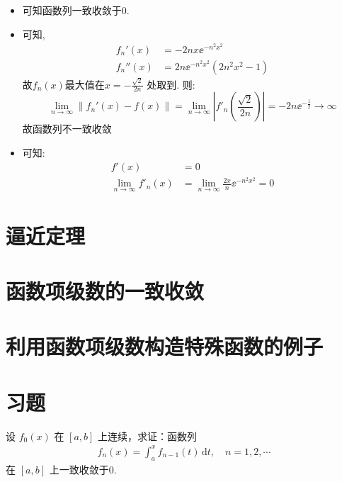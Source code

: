 \begin{solution}
    \begin{itemize}
        \item 可知函数列一致收敛于\(0\).
        \item 可知,
            \begin{align*}
                f_{n}'(x)  & = -2nx\ee^{-n^{2}x^{2}}     \\
                f_{n}''(x) & = 2n\ee^{-n^{2}x^{2}}\left(
                2n^{2}x^{2} - 1\right)
            \end{align*}
            故\(f_{n}(x)\)最大值在\(x = -\frac{\sqrt{2}}{2n}\) 处取到.
            则: \[
                \lim_{n \to \infty} \left\lVert f_{n}'(x) - f(x)
                \right\rVert = \lim_{n \to \infty} \left|
                f'_{n}\left(\frac{\sqrt{2}}{2n}\right) \right| =
                -2n\ee^{-\frac{1}{2}} \to \infty
            \]
            故函数列不一致收敛
        \item 可知:
            \begin{align*}
                f'(x)                         & = 0                   \\
                \lim_{n \to \infty} f'_{n}(x) & = \lim_{n \to \infty}
                \frac{2x}{n}\ee^{-n^{2}x^{2}} = 0
            \end{align*}
    \end{itemize}
\end{solution}
\section{逼近定理}
\section{函数项级数的一致收敛}
\section{利用函数项级数构造特殊函数的例子}
\section{习题}

\begin{problem}
    设 \(f_0(x)\) 在 \([a, b]\) 上连续，求证：函数列
    \begin{align*}
        f_n(x) = \int_a^x f_{n-1}(t) \, \mathrm{d}t, \quad n = 1, 2, \cdots
    \end{align*}
    在 \([a, b]\) 上一致收敛于0.
\end{problem}

